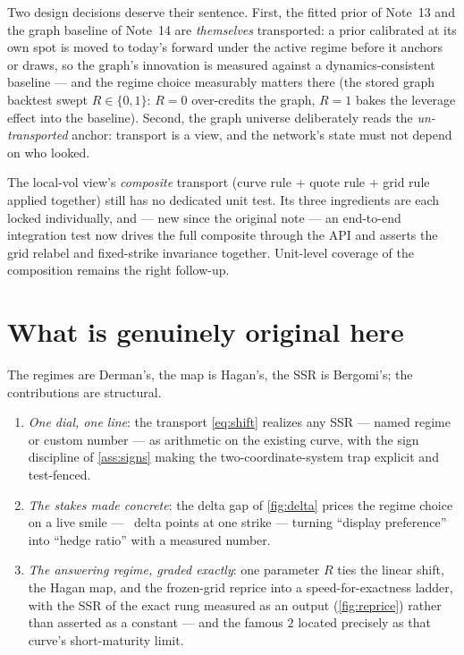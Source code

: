 \documentclass[11pt]{article}
\begin{document}
Two design decisions deserve their sentence.  First, the fitted prior
of Note~13 and the graph baseline of Note~14 are \emph{themselves}
transported: a prior calibrated at its own spot is moved to today's
forward under the active regime before it anchors or draws, so the
graph's innovation is measured against a dynamics-consistent baseline
--- and the regime choice measurably matters there (the stored graph
backtest swept $R\in\{0,1\}$: $R=0$ over-credits the graph, $R=1$
bakes the leverage effect into the baseline).  Second, the graph
universe deliberately reads the \emph{un-transported} anchor: transport
is a view, and the network's state must not depend on who looked.

\begin{remark}
\label{rem:gap}
The local-vol view's \emph{composite} transport (curve rule + quote
rule + grid rule applied together) still has no dedicated unit test.
Its three ingredients are each locked individually, and --- new since
the original note --- an end-to-end integration test now drives the
full composite through the API and asserts the grid relabel and
fixed-strike invariance together.  Unit-level coverage of the
composition remains the right follow-up.
\end{remark}

\section{What is genuinely original here}
\label{sec:original}

The regimes are Derman's, the map is Hagan's, the SSR is Bergomi's; the
contributions are structural.
\begin{enumerate}[leftmargin=1.6em]
\item \emph{One dial, one line}: the transport \eqref{eq:shift}
realizes any SSR --- named regime or custom number --- as arithmetic on
the existing curve, with the sign discipline of \cref{ass:signs} making
the two-coordinate-system trap explicit and test-fenced.
\item \emph{The stakes made concrete}: the delta gap of
\cref{fig:delta} prices the regime choice on a live smile ---
\smddeltagap\ delta points at one strike --- turning ``display
preference'' into ``hedge ratio'' with a measured number.
\item \emph{The answering regime, graded exactly}: one parameter $R$
ties the linear shift, the Hagan map, and the frozen-grid reprice into
a speed-for-exactness ladder, with the SSR of the exact rung measured
as an output (\cref{fig:reprice}) rather than asserted as a constant
--- and the famous $2$ located precisely as that curve's short-maturity
limit.
\end{enumerate}
\end{document}
